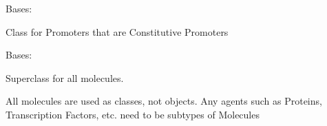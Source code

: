 \documentclass[letterpaper,10pt,english]{sphinxmanual}
\begin{document}

\begin{fulllineitems}
\label{modules/index:aosb.core.ConstitutivePromoter}
Bases: {\hyperref[modules/index:aosb.core.Promoter]{}}

Class for Promoters that are Constitutive Promoters

\begin{fulllineitems}
\label{modules/index:aosb.core.ConstitutivePromoter.after}
\end{fulllineitems}


\begin{fulllineitems}
\label{modules/index:aosb.core.ConstitutivePromoter.before}
\end{fulllineitems}


\begin{fulllineitems}
\label{modules/index:aosb.core.ConstitutivePromoter.moleculeConnection}
\end{fulllineitems}


\begin{fulllineitems}
\label{modules/index:aosb.core.ConstitutivePromoter.namespace}
\end{fulllineitems}


\end{fulllineitems}


\begin{fulllineitems}
\label{modules/index:aosb.core.Molecule}
Bases: 

Superclass for all molecules.

All molecules are used as classes, not objects. Any agents such as
Proteins, Transcription Factors, etc. need to be subtypes of Molecules

\end{fulllineitems}
\end{document}
